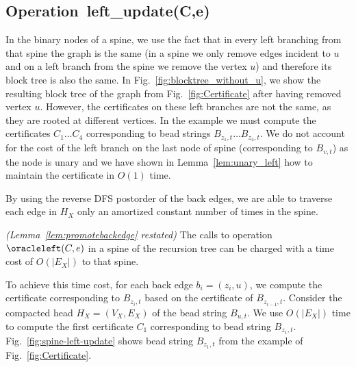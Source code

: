 \subsection{Operation~left\_update(C,e)} 
In the binary nodes of a spine, we use
the fact that in every left branching from that spine the graph is
the same (in a spine we only remove edges incident to $u$ and on a
left branch from the spine we remove the vertex $u$) and therefore its
block tree is also the same. In Fig.~\ref{fig:blocktree_without_u},
we show the resulting block tree of the graph from
Fig.~\ref{fig:Certificate} after having removed vertex $u$. However,
the certificates on these left branches are not the same, as they are
rooted at different vertices. In the example we must compute the
certificates $C_1 \ldots C_4$ corresponding to bead strings $B_{z_1,t}
\ldots B_{z_4,t}$. We do not account for the cost of the left
branch on the last node of spine (corresponding to $B_{v,t}$) as the
node is unary and we have shown in Lemma~\ref{lem:unary_left} how to
maintain the certificate in $O(1)$ time.

By using the reverse DFS postorder of the back edges, we are able
to traverse each edge in $H_X$ only an amortized constant number of
times in the spine.
\begin{lemma}
	\emph{(Lemma~\ref{lem:promotebackedge} restated)} The calls to
	operation $\oracleleft(C,e)$ in a spine of the recursion tree
	can be charged with a time cost of $O(|E_X|)$ to that spine. 
\end{lemma}

To achieve this time cost, for each back edge $b_i = (z_i,u)$, we
compute the certificate corresponding to $B_{z_i,t}$ based on the
certificate of $B_{z_{i-1},t}$. Consider the compacted head $H_X =
(V_X , E_X )$ of the bead string $B_{u,t}$. We use $O(|E_X|)$ time to
compute the first certificate $C_1$ corresponding to bead string
$B_{z_1,t}$. Fig.~\ref{fig:spine-left-update} shows bead string
$B_{z_1,t}$ from the example of Fig.~\ref{fig:Certificate}.

